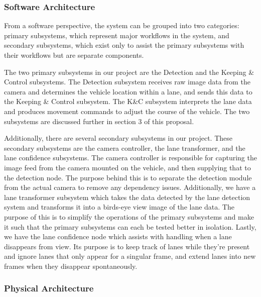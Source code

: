 \documentclass[titlepage,draft]{article}
\begin{document}
\subsubsection{Software Architecture}
From a software perspective, the system can be grouped into two categories: primary subsystems, which represent major workflows in the system, and secondary subsystems, which exist only to assist the primary subsystems with their workflows but are separate components.

The two primary subsystems in our project are the Detection and the Keeping \& Control subsystems. The Detection subsystem receives raw image data from the camera and determines the vehicle location within a lane, and sends this data to the Keeping \& Control subsystem. The K\&C subsystem interprets the lane data and produces movement commands to adjust the course of the vehicle. The two subsystems are discussed further in section 3 of this proposal.

Additionally, there are several secondary subsystems in our project. These secondary subsystems are the camera controller, the lane transformer, and the lane confidence subsystems. The camera controller is responsible for capturing the image feed from the camera mounted on the vehicle, and then supplying that to the detection node. The purpose behind this is to separate the detection module from the actual camera to remove any dependency issues. Additionally, we have a lane transformer subsystem which takes the data detected by the lane detection system and transforms it into a birds-eye view image of the lane data. The purpose of this is to simplify the operations of the primary subsystems and make it such that the primary subsystems can each be tested better in isolation. Lastly, we have the lane confidence node which assists with handling when a lane disappears from view. Its purpose is to keep track of lanes while they're present and ignore lanes that only appear for a singular frame, and extend lanes into new frames when they disappear spontaneously.

\subsubsection{Physical Architecture}
\end{document}
